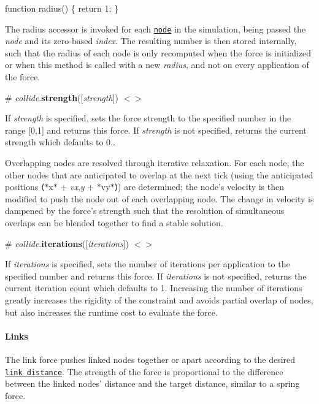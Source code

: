 \begin{DoxyCode}
function radius() \{
  return 1;
\}
\end{DoxyCode}


The radius accessor is invoked for each \href{#simulation_nodes}{\tt node} in the simulation, being passed the {\itshape node} and its zero-\/based {\itshape index}. The resulting number is then stored internally, such that the radius of each node is only recomputed when the force is initialized or when this method is called with a new {\itshape radius}, and not on every application of the force.

\label{_collide_strength}%
\# {\itshape collide}.{\bfseries strength}(\mbox{[}{\itshape strength}\mbox{]}) \href{https://github.com/d3/d3-force/blob/master/src/collide.js#L82}{\tt $<$$>$}

If {\itshape strength} is specified, sets the force strength to the specified number in the range \mbox{[}0,1\mbox{]} and returns this force. If {\itshape strength} is not specified, returns the current strength which defaults to 0..

Overlapping nodes are resolved through iterative relaxation. For each node, the other nodes that are anticipated to overlap at the next tick (using the anticipated positions ⟨$\ast$x$\ast$ + {\itshape vx},{\itshape y} + $\ast$vy$\ast$⟩) are determined; the node’s velocity is then modified to push the node out of each overlapping node. The change in velocity is dampened by the force’s strength such that the resolution of simultaneous overlaps can be blended together to find a stable solution.

\label{_collide_iterations}%
\# {\itshape collide}.{\bfseries iterations}(\mbox{[}{\itshape iterations}\mbox{]}) \href{https://github.com/d3/d3-force/blob/master/src/collide.js#L78}{\tt $<$$>$}

If {\itshape iterations} is specified, sets the number of iterations per application to the specified number and returns this force. If {\itshape iterations} is not specified, returns the current iteration count which defaults to 1. Increasing the number of iterations greatly increases the rigidity of the constraint and avoids partial overlap of nodes, but also increases the runtime cost to evaluate the force.

\paragraph*{Links}

The link force pushes linked nodes together or apart according to the desired \href{#link_distance}{\tt link distance}. The strength of the force is proportional to the difference between the linked nodes’ distance and the target distance, similar to a spring force.

